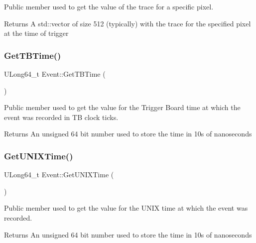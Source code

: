 Public member used to get the value of the trace for a specific pixel. 

\begin{DoxyReturn}{Returns}
A std\+::vector of size 512 (typically) with the trace for the specified pixel at the time of trigger 
\end{DoxyReturn}
\mbox{\label{classEvent_afe50196d5416bcf700843a2d299efa9f}} 
\subsubsection{\texorpdfstring{Get\+T\+B\+Time()}{GetTBTime()}}
{\footnotesize\ttfamily U\+Long64\+\_\+t Event\+::\+Get\+T\+B\+Time (\begin{DoxyParamCaption}{ }\end{DoxyParamCaption})}



Public member used to get the value for the Trigger Board time at which the event was recorded in TB clock ticks. 

\begin{DoxyReturn}{Returns}
An unsigned 64 bit number used to store the time in 10s of nanoseconds 
\end{DoxyReturn}
\mbox{\label{classEvent_aa62f35c4492f0111b8142362f608b5bf}} 
\subsubsection{\texorpdfstring{Get\+U\+N\+I\+X\+Time()}{GetUNIXTime()}}
{\footnotesize\ttfamily U\+Long64\+\_\+t Event\+::\+Get\+U\+N\+I\+X\+Time (\begin{DoxyParamCaption}{ }\end{DoxyParamCaption})}



Public member used to get the value for the U\+N\+IX time at which the event was recorded. 

\begin{DoxyReturn}{Returns}
An unsigned 64 bit number used to store the time in 10s of nanoseconds 
\end{DoxyReturn}
\mbox{\label{classEvent_a5c49a13db44604d6a0e2f9cd98375044}} 
